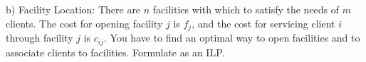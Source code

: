b) Facility Location: There are $n$ facilities with which to satisfy the needs of $m$ clients.  The
cost for opening facility $j$ is $f_j$, and the cost for servicing client $i$
through facility $j$ is $c_{ij}$.  You have to find an optimal way to open
facilities and to associate clients to facilities. Formulate as an ILP.


\exerfoot
